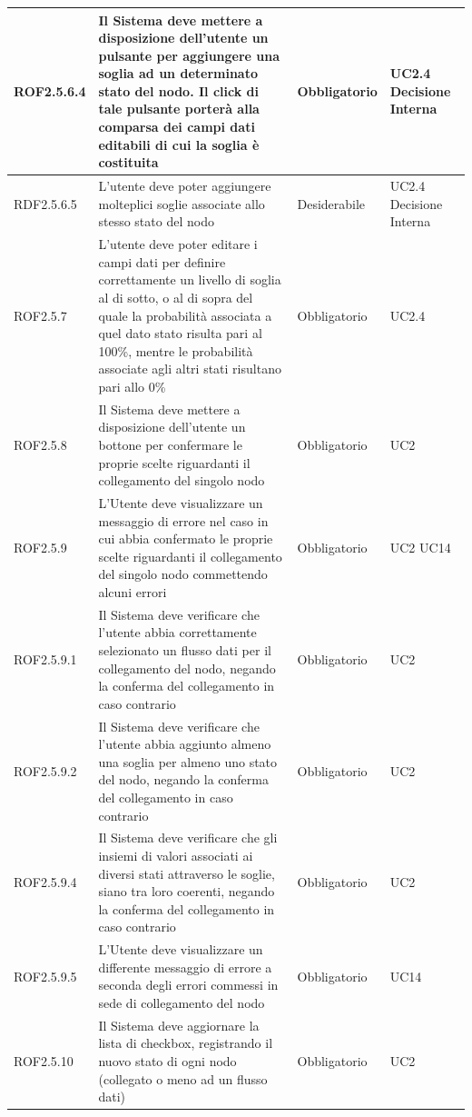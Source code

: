 \begin{center}
\begin{longtable}[c]{|m{}|m{}|m{}|m{}|}
\hline
ROF2.5.6.4 & Il Sistema deve mettere a disposizione dell'utente un pulsante per aggiungere una soglia ad un determinato stato del nodo. Il click di tale pulsante porterà alla comparsa dei campi dati editabili di cui la soglia è costituita & Obbligatorio & UC2.4 Decisione Interna\\
\hline
\rowcolor{grigio}RDF2.5.6.5 & L'utente deve poter aggiungere molteplici soglie associate allo stesso stato del nodo & Desiderabile & UC2.4 Decisione Interna\\
\hline
ROF2.5.7 & L'utente deve poter editare i campi dati per definire correttamente un livello di soglia al di sotto, o al di sopra del quale la probabilità associata a quel dato stato risulta pari al 100\%, mentre le probabilità associate agli altri stati risultano pari allo 0\% & Obbligatorio & UC2.4\\
\hline
\rowcolor{grigio}ROF2.5.8 & Il Sistema deve mettere a disposizione dell'utente un bottone per confermare le proprie scelte riguardanti il collegamento del singolo nodo & Obbligatorio & UC2\\
\hline
ROF2.5.9 & L'Utente deve visualizzare un messaggio di errore nel caso in cui abbia confermato le proprie scelte riguardanti il collegamento del singolo nodo commettendo alcuni errori & Obbligatorio & UC2 UC14\\
\hline
\rowcolor{grigio}ROF2.5.9.1 & Il Sistema deve verificare che l'utente abbia correttamente selezionato un flusso dati per il collegamento del nodo, negando la conferma del collegamento in caso contrario & Obbligatorio & UC2\\
\hline
ROF2.5.9.2 & Il Sistema deve verificare che l'utente abbia aggiunto almeno una soglia per almeno uno stato del nodo, negando la conferma del collegamento in caso contrario & Obbligatorio & UC2\\
\hline
\rowcolor{grigio}ROF2.5.9.4 & Il Sistema deve verificare che gli insiemi di valori associati ai diversi stati attraverso le soglie, siano tra loro coerenti, negando la conferma del collegamento in caso contrario & Obbligatorio & UC2\\
\hline
ROF2.5.9.5 & L'Utente deve visualizzare un differente messaggio di errore a seconda degli errori commessi in sede di collegamento del nodo & Obbligatorio & UC14\\
\hline
\rowcolor{grigio}ROF2.5.10 & Il Sistema deve aggiornare la lista di checkbox, registrando il nuovo stato di ogni nodo (collegato o meno ad un flusso dati) & Obbligatorio & UC2\\

\end{longtable}
\end{center}
